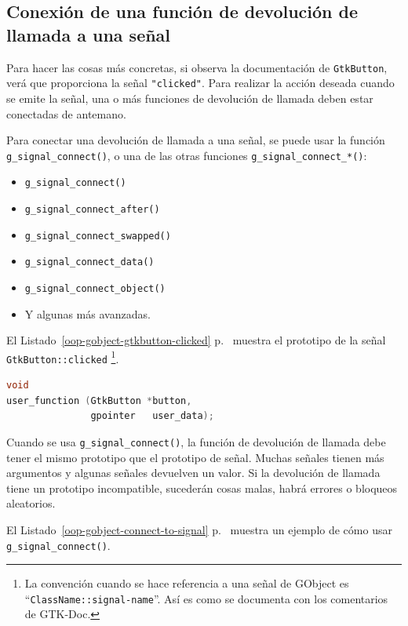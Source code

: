 \subsection{Conexión de una función de devolución de llamada a una señal}

Para hacer las cosas más concretas, si observa la documentación de \lstinline{GtkButton}, verá que proporciona la señal \lstinline{"clicked"}. Para realizar la acción deseada cuando se emite la señal, una o más funciones de devolución de llamada deben estar conectadas de antemano.

Para conectar una devolución de llamada a una señal, se puede usar la función \lstinline{g_signal_connect()}, o una de las otras funciones \lstinline{g_signal_connect_*()}:
\begin{itemize}
  \item \lstinline{g_signal_connect()}
  \item \lstinline{g_signal_connect_after()}
  \item \lstinline{g_signal_connect_swapped()}
  \item \lstinline{g_signal_connect_data()}
  \item \lstinline{g_signal_connect_object()}
  \item Y algunas más avanzadas.
\end{itemize}

El Listado~\ref{oop-gobject-gtkbutton-clicked} p.~\pageref{oop-gobject-gtkbutton-clicked} muestra el prototipo de la señal \lstinline{GtkButton::clicked} \footnote{La convención cuando se hace referencia a una señal de GObject es ``\lstinline{ClassName::signal-name}''. Así es como se documenta con los comentarios de GTK-Doc.}.

\begin{lstlisting}[language=C, caption={El prototipo de la señal \lstinline{GtkButton::clicked}.}, label=oop-gobject-gtkbutton-clicked]
void
user_function (GtkButton *button,
               gpointer   user_data);
\end{lstlisting}

Cuando se usa \lstinline{g_signal_connect()}, la función de devolución de llamada debe tener el mismo prototipo que el prototipo de señal. Muchas señales tienen más argumentos y algunas señales devuelven un valor. Si la devolución de llamada tiene un prototipo incompatible, sucederán cosas malas, habrá errores o bloqueos aleatorios.

El Listado~\ref{oop-gobject-connect-to-signal} p.~\pageref{oop-gobject-connect-to-signal} muestra un ejemplo de cómo usar \lstinline{g_signal_connect()}.

